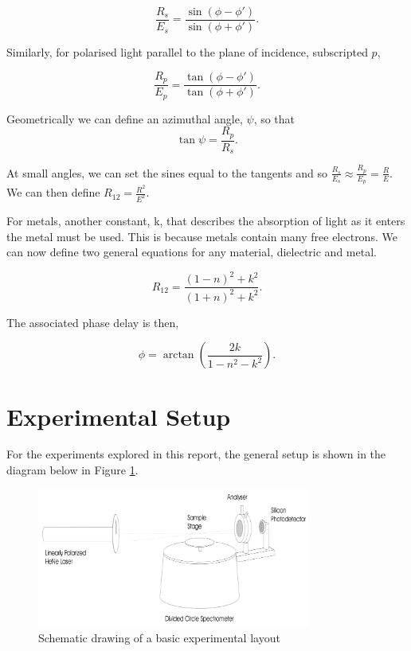 \documentclass{article}
\begin{document}
\begin{equation}
    \frac{R_s}{E_s} = \frac{\sin{(\phi - \phi ')}}{\sin{(\phi 
    + \phi ')}}.
\end{equation}

Similarly, for polarised light parallel to the plane of incidence,
subscripted $p$,

\begin{equation}
    \frac{R_p}{E_p} = \frac{\tan{(\phi - \phi ')}}{\tan{(\phi 
    + \phi ')}}.
\end{equation}

Geometrically we can define an azimuthal angle, $\psi$, so that
\begin{equation}
    \tan{\psi} = \frac{R_p}{R_s}.
\end{equation}

At small angles, we can set the sines equal to the tangents and 
so $\frac{R_s}{E_s}\approx \frac{R_p}{E_p} = \frac{R}{E}$. We can 
then define $R_{12} = \frac{R^2}{E^2}$.

For metals, another constant, k, that describes the absorption of
light as it enters the metal must be used. This is because metals 
contain many free electrons. We can now define two general equations 
for any material, dielectric and metal.

\begin{equation} \label{eq:reflection}
    R_{12} = \frac{(1-n)^2+k^2}{(1+n)^2+k^2}.
\end{equation}

The associated phase delay is then,

\begin{equation} \label{eq:phi}
    \phi = \arctan{\left(\frac{2k}{1-n^2-k^2}\right)}.
\end{equation}



\section{Experimental Setup}
For the experiments explored in this report, the general 
setup is shown in the diagram below in Figure \ref{fig:diagram}.

\begin{figure}[H]
    \centering
    \includegraphics[width=0.8\textwidth]{experimentsetup.png}
    \caption{Schematic drawing of a basic experimental layout}
    \label{fig:diagram}
\end{figure}
\end{document}
